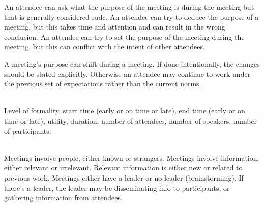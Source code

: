 An attendee can ask what the purpose of the meeting is during the meeting but that is generally considered rude. An attendee can try to deduce the purpose of a meeting, but this takes time and attention and can result in the wrong conclusion. An attendee can try to set the purpose of the meeting during the meeting, but this can conflict with the intent of other attendees. 

A meeting's purpose can shift during a meeting. If done intentionally, the changes should be stated explicitly. Otherwise an attendee may continue to work under the previous set of expectations rather than the current norms. 

\ \\


Level of formality, start time (early or on time or late), 
end time (early or on time or late), utility, 
duration, number of attendees, number of speakers, number of participants.

\ \\


Meetings involve people, either known or strangers.
Meetings involve information, either relevant or irrelevant. Relevant information is either new or related to previous work.
Meetings either have a leader or no leader (brainstorming). If there's a leader, the leader may be disseminating info to participants, or gathering information from attendees.


